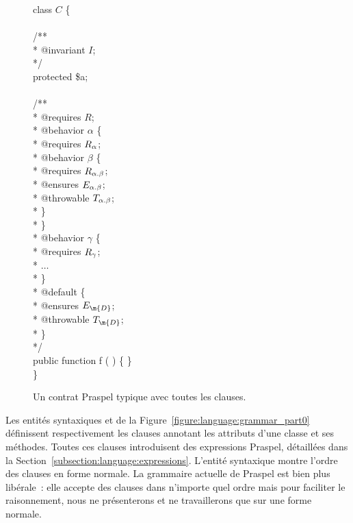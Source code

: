 \begin{figure}
\begin{pre}
class \(C\) \{ \\
\\
    /** \\
     * @invariant \(I\); \\
     */ \\
    protected \$a; \\
\\
    /** \\
     * @requires \(R\); \\
     * @behavior \(\alpha\) \{ \\
     *     @requires \(R\sb{\alpha}\); \\
     *     @behavior \(\beta\) \{ \\
     *         @requires  \(R\sb{\alpha.\beta}\); \\
     *         @ensures   \(E\sb{\alpha.\beta}\); \\
     *         @throwable \(T\sb{\alpha.\beta}\); \\
     *     \} \\
     * \} \\
     * @behavior \(\gamma\) \{ \\
     *     @requires \(R\sb{\gamma}\); \\
     *     \(\dots\) \\
     * \} \\
     * @default \{ \\
     *     @ensures   \(E\sb{\m{D}}\); \\
     *     @throwable \(T\sb{\m{D}}\); \\
     * \} \\
     */ \\
    public function f ( ) \{ \} \\
\}
\end{pre}

\caption{\label{figure:language:typical_contract} Un contrat Praspel typique
avec toutes les clauses.}

\end{figure}

Les entités syntaxiques  et  de
la Figure~\ref{figure:language:grammar_part0} définissent respectivement les
clauses annotant les attributs d'une classe et ses méthodes. Toutes ces clauses
introduisent des expressions Praspel, détaillées dans la
Section~\ref{subsection:language:expressions}. L'entité syntaxique
 montre l'ordre des clauses en forme normale. La grammaire
actuelle de Praspel est bien plus libérale~: elle accepte des clauses dans
n'importe quel ordre mais pour faciliter le raisonnement, nous ne présenterons
et ne travaillerons que sur une forme normale.

